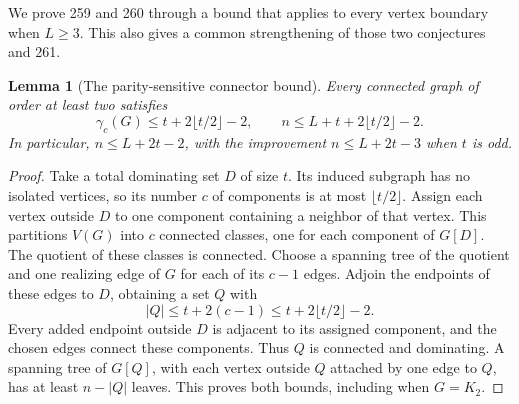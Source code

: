 \documentclass[11pt,a4paper]{article}
\newtheorem{lemma}[theorem]{Lemma}
\theoremstyle{remark}
\begin{document}
We prove 259 and 260 through a bound that applies to every vertex
boundary when $L\ge3$. This also gives a common strengthening of those
two conjectures and 261.

\begin{lemma}[The parity-sensitive connector bound]
\label{r3td:connector}
Every connected graph of order at least two satisfies
\[
 \gamma_c(G)\le t+2\lfloor t/2\rfloor-2,
 \qquad n\le L+t+2\lfloor t/2\rfloor-2.
\]
In particular, $n\le L+2t-2$, with the improvement
$n\le L+2t-3$ when $t$ is odd.
\end{lemma}
\begin{proof}
Take a total dominating set $D$ of size $t$. Its induced subgraph has no
isolated vertices, so its number $c$ of components is at most
$\lfloor t/2\rfloor$. Assign each vertex outside $D$ to one component
containing a neighbor of that vertex. This partitions $V(G)$ into $c$
connected classes, one for each component of $G[D]$. The quotient of
these classes is connected. Choose a spanning tree of the quotient and
one realizing edge of $G$ for each of its $c-1$ edges. Adjoin the endpoints
of these edges to $D$, obtaining a set $Q$ with
\[
 |Q|\le t+2(c-1)\le t+2\lfloor t/2\rfloor-2.
\]
Every added endpoint outside $D$ is adjacent to its assigned component,
and the chosen edges connect these components. Thus $Q$ is connected
and dominating. A spanning tree of $G[Q]$, with each vertex outside $Q$
attached by one edge to $Q$, has at least $n-|Q|$ leaves. This proves both
bounds, including when $G=K_2$.
\end{proof}
\end{document}
